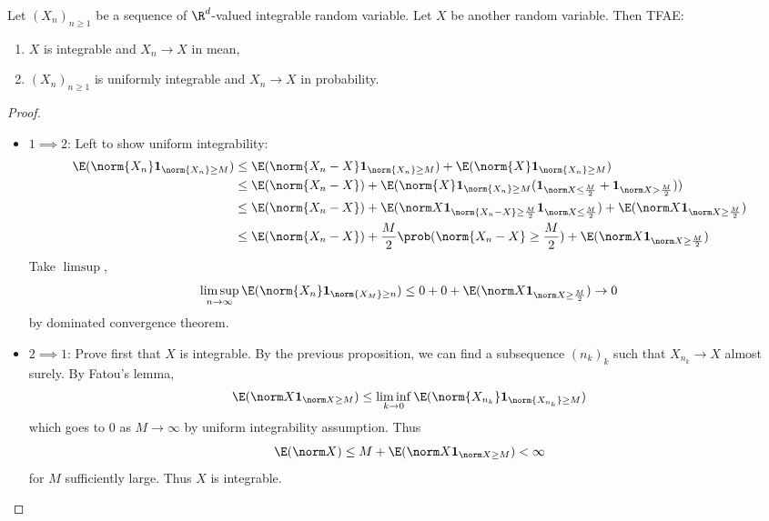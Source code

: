 \documentclass[a4paper]{article}
\renewcommand{\P}{\prob} %
\begin{document}
\begin{theorem}
  Let \((X_n)_{n \geq 1}\) be a sequence of \(\R^d\)-valued integrable random variable. Let \(X\) be another random variable. Then TFAE:
  \begin{enumerate}
  \item \(X\) is integrable and \(X_n \to X\) in mean,
  \item \((X_n)_{n \geq 1}\) is uniformly integrable and \(X_n \to X\) in probability.
  \end{enumerate}
\end{theorem}

\begin{proof}\leavevmode
  \begin{itemize}
  \item \(1 \implies 2\): Left to show uniform integrability:
    \begin{align*}
      \E(\norm{X_n} \mathbf 1_{\norm{X_n} \geq M})
      &\leq \E(\norm{X_n - X} \mathbf 1_{\norm{X_n} \geq M}) + \E(\norm{X} \mathbf 1_{\norm{X_n} \geq M}) \\
      &\leq \E(\norm{X_n - X}) + \E(\norm{X} \mathbf 1_{\norm{X_n} \geq M} (\mathbf 1_{\norm X \leq \frac{M}{2}} + \mathbf 1_{\norm X > \frac{M}{2}})) \\
      &\leq \E(\norm{X_n - X}) + \E(\norm X \mathbf 1_{\norm{X_n - X} \geq \frac{M}{2}} \mathbf 1_{\norm X \leq \frac{M}{2}}) + \E(\norm X \mathbf 1_{\norm X \geq \frac{M}{2}}) \\
      &\leq \E(\norm{X_n - X}) + \frac{M}{2} \P(\norm{X_n - X} \geq \frac{M}{2}) + \E(\norm X \mathbf 1_{\norm X \geq \frac{M}{2}})
    \end{align*}
    Take \(\limsup\),
    \[
      \limsup_{n \to \infty} \E(\norm{X_n} \mathbf 1_{\norm{X_M} \geq n})
      \leq 0 + 0 + \E(\norm X \mathbf 1_{\norm X \geq \frac{M}{2}})
      \to 0
    \]
    by dominated convergence theorem.
  \item \(2 \implies 1\): Prove first that \(X\) is integrable. By the previous proposition, we can find a subsequence \((n_k)_k\) such that \(X_{n_k} \to X\) almost surely. By Fatou's lemma,
    \[
      \E(\norm X \mathbf 1_{\norm X \geq M}) \leq \liminf_{k \to 0} \E(\norm{X_{n_k}} \mathbf 1_{\norm{X_{n_k}} \geq M})
    \]
    which goes to \(0\) as \(M \to \infty\) by uniform integrability assumption. Thus
    \[
      \E(\norm X) \leq M + \E(\norm X \mathbf 1_{\norm X \geq M}) < \infty
    \]
    for \(M\) sufficiently large. Thus \(X\) is integrable.


\end{itemize}
\end{proof}
\end{document}
